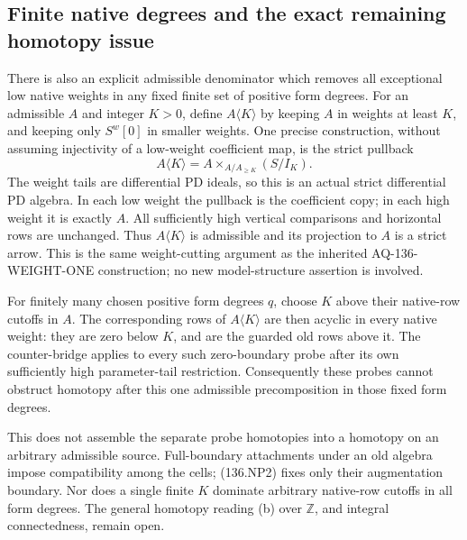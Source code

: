 \subsection{Finite native degrees and the exact remaining homotopy issue}

There is also an explicit admissible denominator which removes
all exceptional low native weights in any fixed finite set of
positive form degrees.  For an admissible \(A\) and integer
\(K>0\), define \(A\langle K\rangle\) by keeping \(A\)
in weights at least \(K\), and keeping only \(S^w[0]\)
in smaller weights.  One precise construction, without assuming
injectivity of a low-weight coefficient map, is the strict
pullback
\[
 A\langle K\rangle
     =A\mathbin{\times}_{A/A_{\geq K}}(S/I_K).
                                                               \tag{136.NP12}
\]
The weight tails are differential PD ideals, so this is an
actual strict differential PD algebra.  In each low weight the
pullback is the coefficient copy; in each high weight it is
exactly \(A\).  All sufficiently high vertical comparisons
and horizontal rows are unchanged.  Thus
\(A\langle K\rangle\) is admissible and its projection to
\(A\) is a strict arrow.  This is the same weight-cutting
argument as the inherited AQ-136-WEIGHT-ONE construction; no
new model-structure assertion is involved.

For finitely many chosen positive form degrees \(q\), choose
\(K\) above their native-row cutoffs in \(A\).  The corresponding
rows of \(A\langle K\rangle\) are then acyclic in every
native weight: they are zero below \(K\), and are the guarded
old rows above it.  The counter-bridge applies to every such
zero-boundary probe after its own sufficiently high parameter-tail
restriction.  Consequently these probes cannot obstruct homotopy
after this one admissible precomposition in those fixed form
degrees.

This does not assemble the separate probe homotopies into a
homotopy on an arbitrary admissible source.  Full-boundary
attachments under an old algebra impose compatibility among
the cells; (136.NP2) fixes only their augmentation boundary.
Nor does a single finite \(K\) dominate arbitrary native-row
cutoffs in all form degrees.  The general homotopy reading (b)
over \(\mathbb Z\), and integral connectedness, remain open.

